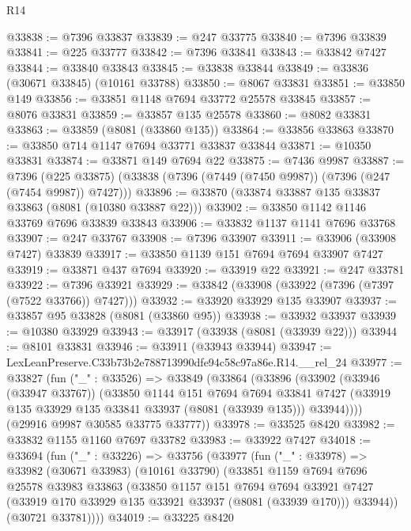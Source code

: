 \begin{lexlean}{R14}
\begin{coremodule}
@33838 := @7396 @33837
@33839 := @247 @33775
@33840 := @7396 @33839
@33841 := @225 @33777
@33842 := @7396 @33841
@33843 := @33842 @7427
@33844 := @33840 @33843
@33845 := @33838 @33844
@33849 := @33836 (@30671 @33845) (@10161 @33788)
@33850 := @8067 @33831
@33851 := @33850 @149
@33856 := @33851 @1148 @7694 @33772 @25578 @33845
@33857 := @8076 @33831
@33859 := @33857 @135 @25578
@33860 := @8082 @33831
@33863 := @33859 (@8081 (@33860 @135))
@33864 := @33856 @33863
@33870 := @33850 @714 @1147 @7694 @33771 @33837 @33844
@33871 := @10350 @33831
@33874 := @33871 @149 @7694 @22
@33875 := @7436 @9987
@33887 := @7396
    (@225 @33875)
    (@33838 (@7396 (@7449 (@7450 @9987)) (@7396 (@247 (@7454 @9987)) @7427)))
@33896 := @33870 (@33874 @33887 @135 @33837 @33863 (@8081 (@10380 @33887 @22)))
@33902 := @33850 @1142 @1146 @33769 @7696 @33839 @33843
@33906 := @33832 @1137 @1141 @7696 @33768
@33907 := @247 @33767
@33908 := @7396 @33907
@33911 := @33906 (@33908 @7427) @33839
@33917 := @33850 @1139 @151 @7694 @7694 @33907 @7427
@33919 := @33871 @437 @7694
@33920 := @33919 @22
@33921 := @247 @33781
@33922 := @7396 @33921
@33929 := @33842 (@33908 (@33922 (@7396 (@7397 (@7522 @33766)) @7427)))
@33932 := @33920 @33929 @135 @33907
@33937 := @33857 @95 @33828 (@8081 (@33860 @95))
@33938 := @33932 @33937
@33939 := @10380 @33929
@33943 := @33917 (@33938 (@8081 (@33939 @22)))
@33944 := @8101 @33831
@33946 := @33911 (@33943 @33944)
@33947 := LexLeanPreserve.C33b73b2e788713990dfe94c58c97a86e.R14.__rel_24
@33977 := @33827
    (fun ("_" : @33526) =>
    @33849
      (@33864
        (@33896
          (@33902
            (@33946 (@33947 @33767))
            (@33850
              @1144
              @151
              @7694
              @7694
              @33841
              @7427
              (@33919 @135 @33929 @135 @33841 @33937 (@8081 (@33939 @135)))
              @33944))))
      (@29916 @9987 @30585 @33775 @33777))
@33978 := @33525 @8420
@33982 := @33832 @1155 @1160 @7697 @33782
@33983 := @33922 @7427
@34018 := @33694
    (fun ("_" : @33226) =>
    @33756
      (@33977
        (fun ("_" : @33978) =>
        @33982
          (@30671 @33983)
          (@10161 @33790)
          (@33851
            @1159
            @7694
            @7696
            @25578
            @33983
            @33863
            (@33850
              @1157
              @151
              @7694
              @7694
              @33921
              @7427
              (@33919 @170 @33929 @135 @33921 @33937 (@8081 (@33939 @170)))
              @33944))
          (@30721 @33781))))
@34019 := @33225 @8420

\end{coremodule}
\end{lexlean}
